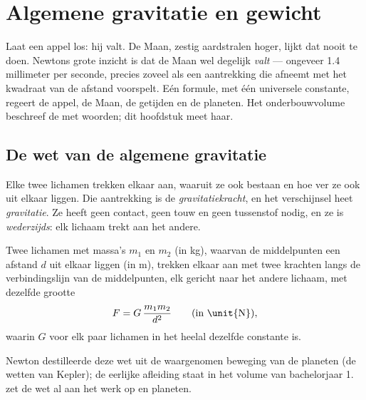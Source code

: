\chapter{Algemene gravitatie en gewicht}\label{ch:g10:universal-gravitation}

Laat een appel los: hij valt. De Maan, zestig aardstralen hoger, lijkt
dat nooit te doen. Newtons grote inzicht is dat de Maan wel degelijk
\emph{valt} --- ongeveer 1.4 millimeter per seconde, precies zoveel als
een aantrekking die afneemt met het kwadraat van de afstand voorspelt.
Eén formule, met één universele constante, regeert de appel, de Maan, de
getijden en de planeten. Het onderbouwvolume beschreef de  met
woorden; dit hoofdstuk meet haar.

\section{De wet van de algemene gravitatie}

\begin{definition}[Gravitatiekracht]\label{def:g10:universal-gravitation:force}
Elke twee lichamen trekken elkaar aan, waaruit ze ook bestaan en hoe ver
ze ook uit elkaar liggen. Die aantrekking is de
\emph{gravitatiekracht}, en het verschijnsel heet
\emph{gravitatie}. Ze heeft geen contact, geen touw en
geen tussenstof nodig, en ze is \emph{wederzijds}: elk lichaam trekt aan
het andere.
\end{definition}

\begin{theorem}\label{thm:g10:universal-gravitation:law}
Twee lichamen met massa's $m_1$ en $m_2$ (in \unit{kg}), waarvan de
middelpunten een afstand $d$ uit elkaar liggen (in \unit{m}), trekken
elkaar aan met twee krachten langs de verbindingslijn van de
middelpunten, elk gericht naar het andere lichaam, met dezelfde grootte
\[
F = G\,\frac{m_1 m_2}{d^2}
\qquad \text{(in \unit{N})},
\]
waarin $G$ voor elk paar lichamen in het heelal dezelfde constante is.
\end{theorem}
\admitted

\begin{remark}
Newton destilleerde deze wet uit de waargenomen beweging van de planeten
(de wetten van Kepler); de eerlijke afleiding staat in het volume van
bachelorjaar 1.  zet de wet al aan het
werk op  en planeten.
\end{remark}

